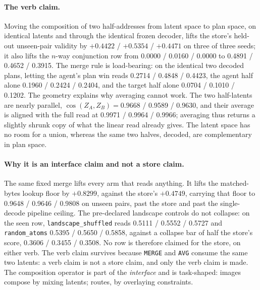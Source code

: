 \documentclass{article} %
\begin{document}
\paragraph{The verb claim.} Moving the composition of two half-addresses from latent space to
plan space, on identical latents and through the identical frozen decoder, lifts the store's
held-out unseen-pair validity by $+0.4422$ / $+0.5354$ / $+0.4471$ on three of three seeds; it
also lifts the $n$-way conjunction row from 0.0000 / 0.0160 / 0.0000 to 0.4891 / 0.4652 / 0.3915.
The merge rule is load-bearing: on the identical two decoded plans, letting the agent's plan
win reads 0.2714 / 0.4848 / 0.4423, the agent half alone 0.1960 / 0.2424 / 0.2404, and the target
half alone 0.0704 / 0.1010 / 0.1202. %
The geometry explains why averaging cannot work. The two half-latents are nearly parallel,
$\cos(Z_A,Z_B)=0.9668$ / 0.9589 / 0.9630, and their average is aligned with the full read at
0.9971 / 0.9964 / 0.9966; averaging thus returns a slightly shrunk copy of what the linear read
already gives. The latent space has no room for a union, whereas the same two halves, decoded,
are complementary in plan space. %

\paragraph{Why it is an interface claim and not a store claim.} The same fixed merge lifts every
arm that reads anything. It lifts the matched-bytes lookup floor by $+0.8299$, against the
store's $+0.4749$, carrying that floor to 0.9648 / 0.9646 / 0.9808 on unseen pairs, past the
store and past the single-decode pipeline ceiling. %
The pre-declared landscape controls do not collapse: on the seen row, \texttt{landscape\_shuffled} reads 0.5111
/ 0.5552 / 0.5727 and \texttt{random\_atoms} 0.5395 / 0.5650 / 0.5858, against a collapse bar of
half the store's score, 0.3606 / 0.3455 / 0.3508. %
No row is therefore claimed for the store, on either verb. The verb claim survives because
\texttt{MERGE} and \texttt{AVG} consume the same two latents: a verb claim is not a store claim,
and only the verb claim is made. The composition operator is part of the \emph{interface} and is task-shaped: images compose by mixing latents; routes, by overlaying constraints.
\end{document}
